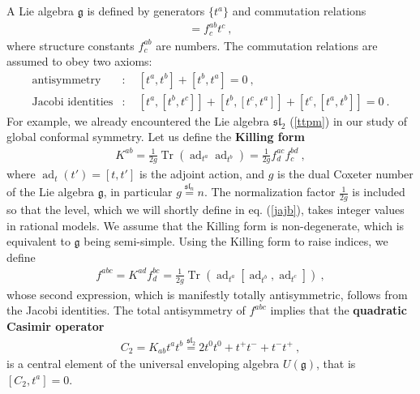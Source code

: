 \documentclass[12pt,a4paper,notitlepage]{report}
\numberwithin{equation}{section}
\theoremstyle{break}
\begin{document}
A Lie algebra $\mathfrak{g}$ is defined by generators $\{t^a\}$ and commutation relations 
\begin{align}
 [t^a,t^b] = f^{ab}_c t^c \ ,
\label{ttft}
\end{align}
where structure constants $f^{ab}_c$ are numbers. The commutation relations are assumed to obey two axioms:
\begin{align}
 \text{antisymmetry} & : \quad [t^a,t^b] + [t^b,t^a] = 0\ ,
\\
\text{Jacobi identities} & : \quad  [t^a,[t^b,t^c]] + [t^b,[t^c,t^a]] + [t^c,[t^a,t^b]] = 0 \ .
\end{align}
For example, we already encountered the Lie algebra $\mathfrak{sl}_2$ (\ref{ttpm}) in our study of global conformal symmetry.
Let us define the \textbf{\boldmath Killing form} 
\begin{align}
 K^{ab} = \frac{1}{2g} \operatorname{Tr} \left(\operatorname{ad}_{t^a}\operatorname{ad}_{t^b}\right) =\frac{1}{2g} f^{ac}_d f^{bd}_c\ ,
\end{align}
where  $\operatorname{ad}_t(t') = [t,t']$ is the adjoint action, and $g$ is the dual Coxeter number of the Lie algebra $\mathfrak{g}$, in particular $g\overset{\mathfrak{sl}_n}{=}n$. The normalization factor $\frac{1}{2g}$ is included so that the level, which we will shortly define in eq. (\ref{jajb}), takes integer values in rational models. We assume that the Killing form is non-degenerate, which is equivalent to $\mathfrak{g}$ being semi-simple. 
Using the Killing form to raise indices, we define
\begin{align}
 f^{abc} = K^{ad}f_d^{bc} = \frac{1}{2g}\operatorname{Tr}\left( \operatorname{ad}_{t^a} [\operatorname{ad}_{t^b}, \operatorname{ad}_{t^c}] \right)\ ,
\end{align}
whose second expression, which is manifestly totally antisymmetric, follows from the Jacobi identities. The total antisymmetry of $f^{abc}$ implies that the \textbf{\boldmath quadratic Casimir operator}
\begin{align}
 C_2 = K_{ab} t^a t^b \overset{\mathfrak{sl}_2}{=} 2t^0t^0+ t^+t^-+t^-t^+\ ,
\label{ctk}
\end{align}
is a central element of the universal enveloping algebra $U(\mathfrak{g})$, that is $[C_2,t^a]=0$.
\end{document}
